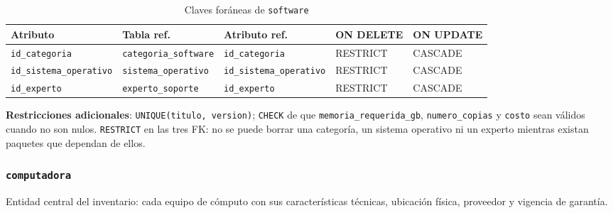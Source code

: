 \documentclass[10pt,a4paper]{article}
\begin{document}
\begin{table}[H]
	\centering
	\footnotesize
	\begin{tabular}{p{3.6cm} | p{3.4cm} | p{3.4cm} | p{1.5cm} | p{1.5cm}}\hline \hline
		\textbf{Atributo} & \textbf{Tabla ref.} & \textbf{Atributo ref.} & \textbf{ON DELETE} & \textbf{ON UPDATE} \\ \hline \hline
		\texttt{id\_categoria} & \texttt{categoria\_software} & \texttt{id\_categoria} & RESTRICT & CASCADE \\ \hline
		\texttt{id\_sistema\_operativo} & \texttt{sistema\_operativo} & \texttt{id\_sistema\_operativo} & RESTRICT & CASCADE \\ \hline
		\texttt{id\_experto} & \texttt{experto\_soporte} & \texttt{id\_experto} & RESTRICT & CASCADE \\ \hline \hline
	\end{tabular}
	\caption{Claves foráneas de \texttt{software}}
	\label{tabla:fk-software}
\end{table}

\textbf{Restricciones adicionales}: \texttt{UNIQUE(titulo, version)}; \texttt{CHECK} de que \texttt{memoria\_\allowbreak requerida\_gb}, \texttt{numero\_\allowbreak copias} y \texttt{costo} sean válidos cuando no son nulos. \texttt{RESTRICT} en las tres FK: no se puede borrar una categoría, un sistema operativo ni un experto mientras existan paquetes que dependan de ellos.

\subsubsection{\texttt{computadora}}

Entidad central del inventario: cada equipo de cómputo con sus características técnicas, ubicación física, proveedor y vigencia de garantía.
\end{document}
